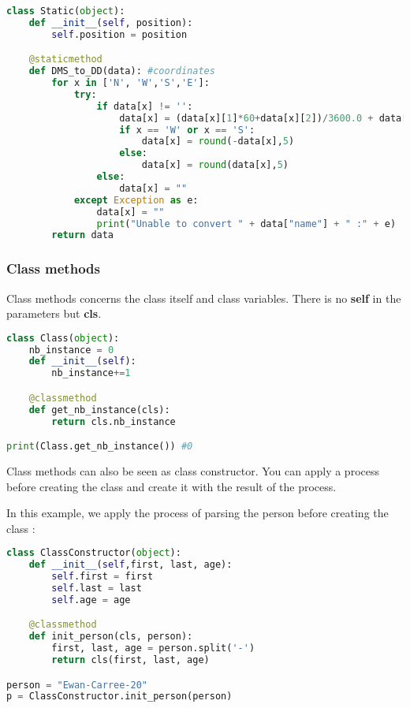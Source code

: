 \documentclass[a4paper, 12pt, titlepage]{scrartcl} %
\begin{document}
\begin{lstlisting}[language=Python]
class Static(object):
	def __init__(self, position):
		self.position = position

	@staticmethod
	def DMS_to_DD(data): #coordinates
		for x in ['N', 'W','S','E']:
			try:
				if data[x] != '':
					data[x] = (data[x][1]*60+data[x][2])/3600.0 + data[x][0]
					if x == 'W' or x == 'S':
						data[x] = round(-data[x],5)
					else:
						data[x] = round(data[x],5)
				else:
					data[x] = ""
			except Exception as e:
				data[x] = ""
				print("Unable to convert " + data["name"] + " :" + e)
		return data
\end{lstlisting} \vspace{5mm}

\subsubsection{Class methods}
Class methods concerns the class itself and class variables. There is no \textbf{self} in the parameters but \textbf{cls}.

\begin{lstlisting}[language=Python]
class Class(object):
	nb_instance = 0
	def __init__(self):
		nb_instance+=1

	@classmethod
	def get_nb_instance(cls):
		return cls.nb_instance

print(Class.get_nb_instance()) #0
\end{lstlisting} \vspace{5mm}

Class methods can also be seen as class constructor. You can apply a process before creating the class and create it with the result of the process.

\vspace{5mm}

In this example, we apply the process of parsing the person before creating the class :

\begin{lstlisting}[language=Python]
class ClassConstructor(object):
	def __init__(self,first, last, age):
		self.first = first
		self.last = last
		self.age = age

	@classmethod
	def init_person(cls, person):
		first, last, age = person.split('-')
		return cls(first, last, age)

person = "Ewan-Carree-20"
p = ClassConstructor.init_person(person)
\end{lstlisting} \vspace{5mm}
\end{document}
